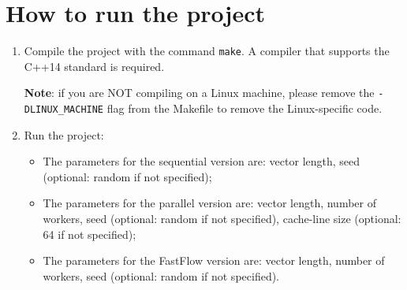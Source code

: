 \section{How to run the project}
\begin{enumerate}
    \item Compile the project with the command \texttt{make}. A compiler that supports the C++14 standard is required.
    
    \textbf{Note}: if you are NOT compiling on a Linux machine, please remove the \texttt{-DLINUX\_MACHINE} flag from the Makefile to remove the Linux-specific code.

    \item Run the project:
    \begin{itemize}
        \item The parameters for the sequential version are: vector length, seed (optional: random if not specified);
        \item The parameters for the parallel version are: vector length, number of workers, seed (optional: random if not specified), cache-line size (optional: 64 if not specified);
        \item The parameters for the FastFlow version are: vector length, number of workers, seed (optional: random if not specified).
    \end{itemize}
\end{enumerate}

